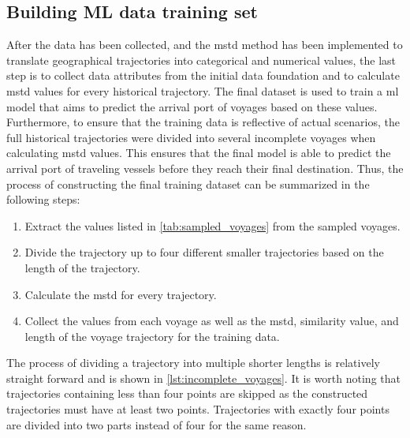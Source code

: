 \subsection{Building ML data training set}

After the data has been collected, and the \acrshort{mstd} method has been implemented to translate geographical trajectories into categorical and numerical values, the last step is to collect data attributes from the initial data foundation and to calculate \acrshort{mstd} values for every historical trajectory. The final dataset is used to train a \acrfull{ml} model that aims to predict the arrival port of voyages based on these values. Furthermore, to ensure that the training data is reflective of actual scenarios, the full historical trajectories were divided into several incomplete voyages when calculating \acrshort{mstd} values. This ensures that the final model is able to predict the arrival port of traveling vessels before they reach their final destination. Thus, the process of constructing the final training dataset can be summarized in the following steps:

\begin{enumerate}
    \item Extract the values listed in \cref{tab:sampled_voyages} from the sampled voyages.
    \item Divide the trajectory up to four different smaller trajectories based on the length of the trajectory.
    \item Calculate the \acrshort{mstd} for every trajectory.
    \item Collect the values from each voyage as well as the \acrshort{mstd}, similarity value, and length of the voyage trajectory for the training data.
\end{enumerate}

The process of dividing a trajectory into multiple shorter lengths is relatively straight forward and is shown in \cref{lst:incomplete_voyages}. It is worth noting that trajectories containing less than four points are skipped as the constructed trajectories must have at least two points. Trajectories with exactly four points are divided into two parts instead of four for the same reason.

